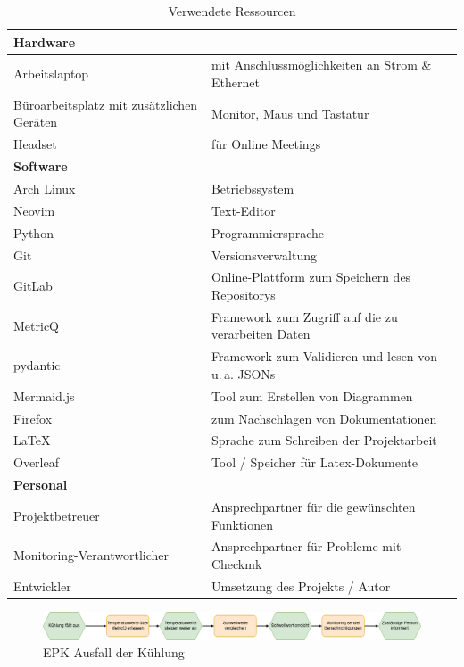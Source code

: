 \begin{table}[H]
  \centering
  \begin{tabular}{l l}
    \hline
    \textbf{Hardware}   &  \\
    \hline
    Arbeitslaptop    & mit Anschlussmöglichkeiten an Strom \& Ethernet \\
    Büroarbeitsplatz mit zusätzlichen Geräten & Monitor, Maus und Tastatur\\
    Headset        & für Online Meetings \\
    \hline
    \textbf{Software}   &  \\
    \hline
    Arch Linux      & Betriebssystem \\
    Neovim         & Text-Editor \\
    Python        & Programmiersprache \\
    Git          & Versionsverwaltung \\
    GitLab        & Online-Plattform zum Speichern des Repositorys \\
    MetricQ        & Framework zum Zugriff auf die zu verarbeiten Daten \\
    pydantic      & Framework zum Validieren und lesen von u.\,a. JSONs \\
    Mermaid.js      & Tool zum Erstellen von Diagrammen \\
    Firefox        & zum Nachschlagen von Dokumentationen \\
    LaTeX        & Sprache zum Schreiben der Projektarbeit\\
    Overleaf      & Tool / Speicher für Latex-Dokumente\\
    \hline
    \textbf{Personal}   &  \\
    \hline
    Projektbetreuer    & Ansprechpartner für die gewünschten Funktionen \\
    Monitoring-Verantwortlicher  & Ansprechpartner für Probleme mit Checkmk \\
    Entwickler      & Umsetzung des Projekts / Autor \\
  \end{tabular}
  \caption{Verwendete Ressourcen}
  \label{tab:verwendete-ressourcen}
\end{table}

\begin{figure}[H]
  \centering
  \includegraphics[width=\textwidth]{images/epk-cooling-fails.png}
  \caption{EPK Ausfall der Kühlung}
  \label{fig:epk-cooling-fails}
\end{figure}

